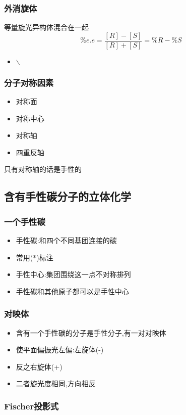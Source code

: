 \documentclass[11pt]{article}
\begin{document}
\subsubsection{外消旋体}
\label{sec:orga45b1d7}
等量旋光异构体混合在一起
\[
\%e.e=\frac{[R]-[S]}{[R]+[S]} =\%R -\%S
\]
\begin{itemize}
\item $\backslash$%
\end{itemize}
\subsubsection{分子对称因素}
\label{sec:org742169d}
\begin{itemize}
\item 对称面
\item 对称中心
\item 对称轴
\item 四重反轴
\end{itemize}
只有对称轴的话是手性的
\subsection{含有手性碳分子的立体化学}
\label{sec:org21f7cc5}
\subsubsection{一个手性碳}
\label{sec:orgf169cb4}
\begin{itemize}
\item 手性碳:和四个不同基团连接的碳
\item 常用(*)标注
\item 手性中心:集团围绕这一点不对称排列
\item 手性碳和其他原子都可以是手性中心
\end{itemize}
\subsubsection{对映体}
\label{sec:org56f5360}
\begin{itemize}
\item 含有一个手性碳的分子是手性分子,有一对对映体
\item 使平面偏振光左偏:左旋体(-)
\item 反之右旋体(+)
\item 二者旋光度相同,方向相反
\end{itemize}
\subsubsection{Fischer投影式}
\label{sec:org56e0918}
\end{document}
